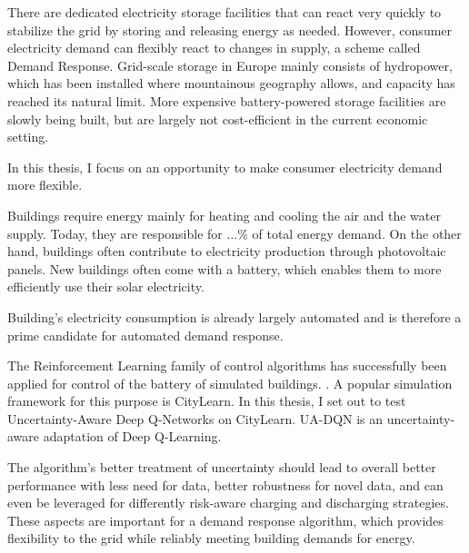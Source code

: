 There are dedicated electricity storage facilities that can react very quickly to stabilize the grid by storing and releasing energy as needed.
However, consumer electricity demand can flexibly react to changes in supply, a scheme called Demand Response.
Grid-scale storage in Europe mainly consists of hydropower, which has been installed where mountainous geography allows, and capacity has reached its natural limit.
More expensive battery-powered storage facilities are slowly being built, but are largely not cost-efficient in the current economic setting.

In this thesis, I focus on an opportunity to make consumer electricity demand more flexible.

Buildings require energy mainly for heating and cooling the air and the water supply. Today, they are responsible for ...\% of total energy demand. On the other hand, buildings often contribute to electricity production through photovoltaic panels. New buildings often come with a battery, which enables them to more efficiently use their solar electricity.

Building's electricity consumption is already largely automated and is therefore a prime candidate for automated demand response.

The Reinforcement Learning family of control algorithms has successfully been applied for control of the battery of simulated buildings. . A popular simulation framework for this purpose is CityLearn.
In this thesis, I set out to test Uncertainty-Aware Deep Q-Networks  on CityLearn. UA-DQN is an uncertainty-aware adaptation of Deep Q-Learning.

The algorithm's better treatment of uncertainty should lead to overall better performance with less need for data, better robustness for novel data, and can even be leveraged for differently risk-aware charging and discharging strategies.
These aspects are important for a demand response algorithm, which provides flexibility to the grid while reliably meeting building demands for energy. 

